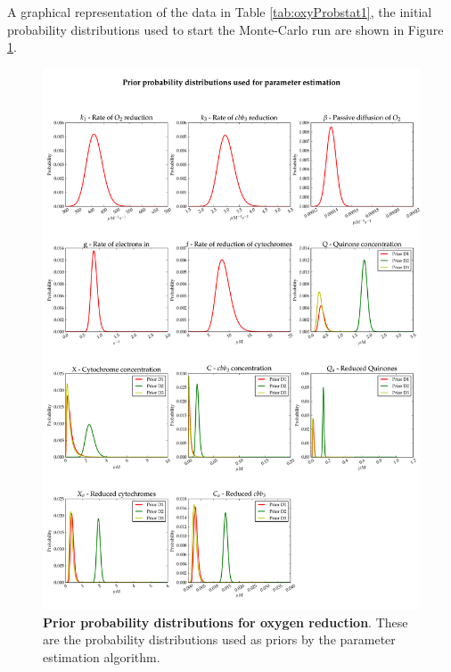 \afterpage{\clearpage}
\noindent A graphical representation of the data in Table \ref{tab:oxyProbstat1}, the initial probability distributions used to start the Monte-Carlo run are shown in Figure \ref{fig:oxypriors1}.
\begin{figure}[p]
 \centering
 \includegraphics[width=15cm, trim=0cm 0cm 0cm 0cm]{./05-oxygenreduction/data/priors2.pdf}
 \caption[Prior probability distributions for oxygen reduction]{{\bf Prior probability distributions for oxygen reduction}. These are the probability distributions used as priors by the parameter estimation algorithm.
 \label{fig:oxypriors1}}
\end{figure}
